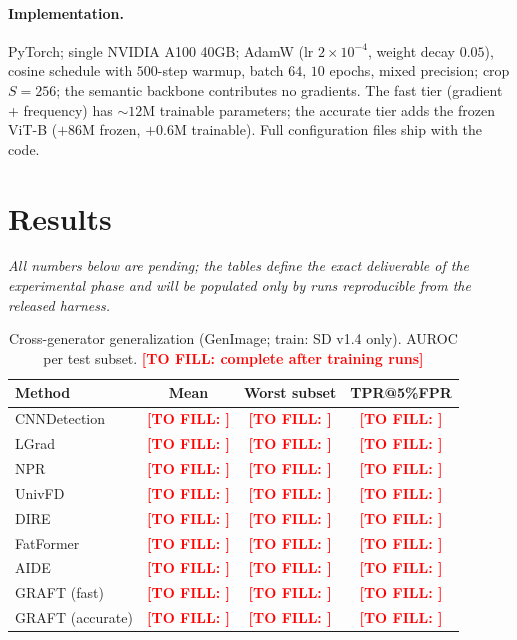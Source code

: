 \documentclass[10pt,twocolumn]{article}
\newcommand{\tofill}[1]{\textcolor{red}{\textbf{[TO FILL: #1]}}}
\begin{document}
\paragraph{Implementation.} PyTorch; single NVIDIA A100 40GB; AdamW
(lr $2{\times}10^{-4}$, weight decay $0.05$), cosine schedule with $500$-step
warmup, batch $64$, $10$ epochs, mixed precision; crop $S{=}256$; the
semantic backbone contributes no gradients. The fast tier (gradient +
frequency) has ${\sim}12$M trainable parameters; the accurate tier adds the
frozen ViT-B ($+86$M frozen, $+0.6$M trainable). Full configuration files
ship with the code.

\section{Results}
\label{sec:results}
\emph{All numbers below are pending; the tables define the exact deliverable
of the experimental phase and will be populated only by runs reproducible
from the released harness.}

\begin{table}[t]
\centering\small
\caption{Cross-generator generalization (GenImage; train: SD v1.4 only).
AUROC per test subset. \tofill{complete after training runs}}
\begin{tabular}{l c c c}
\hline
Method & Mean & Worst subset & TPR@5\%FPR \\
\hline
CNNDetection~\cite{wang2020cnn} & \tofill{} & \tofill{} & \tofill{} \\
LGrad~\cite{tan2023lgrad}       & \tofill{} & \tofill{} & \tofill{} \\
NPR~\cite{tan2024npr}           & \tofill{} & \tofill{} & \tofill{} \\
UnivFD~\cite{ojha2023universal} & \tofill{} & \tofill{} & \tofill{} \\
DIRE~\cite{wang2023dire}        & \tofill{} & \tofill{} & \tofill{} \\
FatFormer~\cite{liu2024fatformer}& \tofill{} & \tofill{} & \tofill{} \\
AIDE~\cite{yan2025sanity}       & \tofill{} & \tofill{} & \tofill{} \\
\hline
GRAFT (fast)     & \tofill{} & \tofill{} & \tofill{} \\
GRAFT (accurate) & \tofill{} & \tofill{} & \tofill{} \\
\hline
\end{tabular}
\label{tab:main}
\end{table}
\end{document}
